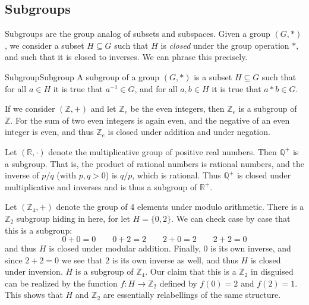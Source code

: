     \subsection{Subgroups}
        Subgroups are the group analog of subsets and subspaces. Given a group
        $(G,*)$, we consider a subset $H\subseteq{G}$ such that $H$ is
        \textit{closed} under the group operation $*$, and such that it is
        closed to inverses. We can phrase this precisely.
        \begin{fdefinition}{Subgroup}{Subgroup}
            A subgroup of a \gls{group} $(G,*)$ is a
             \gls{subset} $H\subseteq{G}$ such
            that for all $a\in{H}$ it is true that $a^{\minus{1}}\in{G}$, and
            for all $a,b\in{H}$ it is true that $a*b\in{G}$.
        \end{fdefinition}
        \begin{example}
            If we consider $(\mathbb{Z},+)$ and let $\mathbb{Z}_{e}$ be the even
            integers, then $\mathbb{Z}_{e}$ is a subgroup of $\mathbb{Z}$. For
            the sum of two even integers is again even, and the negative of an
            even integer is even, and thus $\mathbb{Z}_{e}$ is closed under
            addition and under negation.
        \end{example}
        \begin{example}
            Let $(\mathbb{R},\cdot)$ denote the multiplicative group of positive
            real numbers. Then $\mathbb{Q}^{+}$ is a subgroup. That is, the
            product of rational numbers is rational numbers, and the inverse
            of $p/q$ (with $p,q>0$) is $q/p$, which is rational. Thus
            $\mathbb{Q}^{+}$ is closed under multiplicative and inverses and is
            thus a subgroup of $\mathbb{R}^{+}$.
        \end{example}
        \begin{example}
            Let $(\mathbb{Z}_{4},+)$ denote the group of 4 elements under modulo
            arithmetic. There is a $\mathbb{Z}_{2}$ subgroup hiding in here, for
            let $H=\{0,2\}$. We can check case by case that this is a subgroup:
            \begin{equation}
                0+0=0
                \quad\quad
                0+2=2
                \quad\quad
                2+0=2
                \quad\quad
                2+2=0
            \end{equation}
            and thus $H$ is closed under modular addition. Finally, $0$ is its
            own inverse, and since $2+2=0$ we see that $2$ is its own inverse as
            well, and thus $H$ is closed under inversion. $H$ is a subgroup of
            $\mathbb{Z}_{4}$. Our claim that this is a $\mathbb{Z}_{2}$ in
            disguised can be realized by the function
            $f:H\rightarrow\mathbb{Z}_{2}$ defined by $f(0)=2$ and $f(2)=1$.
            This shows that $H$ and $\mathbb{Z}_{2}$ are essentially
            relabellings of the same structure.
        \end{example}
